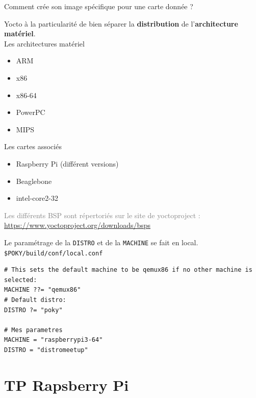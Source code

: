 \documentclass[compress]{smilebeamer}
\begin{document}
\begin{frame}
\begin{center}
\textcolor{smileOrange}{\huge{Comment crée son image spécifique pour une carte donnée ?}}
\end{center}
\end{frame}

\begin{frame}
Yocto à la particularité de bien séparer la \textbf{distribution} de l'\textbf{architecture matériel}.
\newline \\
Les architectures matériel
\begin{itemize}
	\item ARM
	\item x86
	\item x86-64
	\item PowerPC
	\item MIPS
\end{itemize}
Les cartes associés
\begin{itemize}
	\item Raspberry Pi (différent versions)
	\item Beaglebone
	\item intel-core2-32
\end{itemize}
\textcolor{gray}{\tiny{Les différents BSP sont répertoriés sur le site de yoctoproject : \url{https://www.yoctoproject.org/downloads/bsps}}}
\end{frame}

\begin{frame}[fragile]
Le paramétrage de la \texttt{DISTRO} et de la \texttt{MACHINE} se fait en local.
\newline \\
\texttt{\$POKY/build/conf/local.conf}
\begin{lstlisting}[style=bitbake]
# This sets the default machine to be qemux86 if no other machine is selected:
MACHINE ??= "qemux86"
# Default distro:
DISTRO ?= "poky"

# Mes parametres
MACHINE = "raspberrypi3-64"
DISTRO = "distromeetup"
\end{lstlisting}
\end{frame}


\section{TP Rapsberry Pi}
\end{document}
